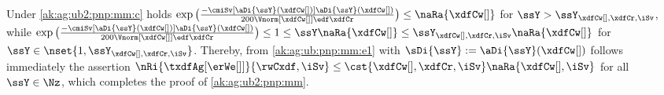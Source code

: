 \begin{pro} Under
  \ref{ak:ag:ub2:pnp:mm:c} holds  
  $\exp\big(\tfrac{-\cmiSv[\aDi{\ssY}({\xdfCw[]})]\aDi{\ssY}({\xdfCw[]})}{200\Vnorm[{\xdfCw[]}]{\edf}\xdfCr}\big)\leq
  \naRa{\xdfCw[]}$  for $\ssY> \ssY_{\xdfCw[],\xdfCr,\iSv}$, while 
  $\exp\big(\tfrac{-\cmiSv[\aDi{\ssY}({\xdfCw[]})]\aDi{\ssY}({\xdfCw[]})}{200\Vnorm[{\xdfCw[]}]{\edf}\xdfCr}\big)\leq1\leq
  \ssY\naRa{\xdfCw[]}\leq \ssY_{\xdfCw[],\xdfCr,\iSv}
  \naRa{{\xdfCw[]}}$ for $\ssY\in\nset{1,\ssY_{\xdfCw[],\xdfCr,\iSv}}$. Thereby, from
  \eqref{ak:ag:ub:pnp:mm:e1} with $\sDi{\ssY}:=\aDi{\ssY}({\xdfCw[]})$
  follows immediately the assertion
    $\nRi{\txdfAg[{\erWe[]}]}{\rwCxdf,\iSv}
    \leq \cst{\xdfCw[],\xdfCr,\iSv} \naRa{\xdfCw[],\iSv}$ for all
    $\ssY\in\Nz$, which  completes the
proof of \cref{ak:ag:ub2:pnp:mm}.\proEnd\end{pro}
